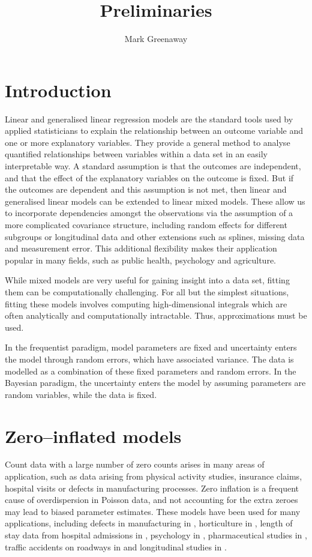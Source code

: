 \documentclass{amsart}[12pt]
\title{Preliminaries}
\author{Mark Greenaway}
\begin{document}
\setlength{\parindent}{0pt}
\maketitle

\section{Introduction}

Linear and generalised linear regression models are the standard tools used by applied statisticians to
explain the relationship between an outcome variable and one or more explanatory variables. They provide a
general method  to analyse quantified relationships between variables within a data set in an easily
interpretable way. A standard assumption is that the outcomes are independent, and that the effect of the
explanatory variables on the outcome is fixed. But if the outcomes are dependent and this assumption is not
met, then linear and generalised linear models can be extended to linear mixed models. These allow us to
incorporate dependencies amongst the  observations via the assumption of a more complicated covariance
structure, including random effects for  different subgroups or longitudinal data and other extensions such as
splines, missing data and measurement error. This additional flexibility makes their application popular in
many fields, such as public health, psychology and agriculture.

While mixed models are very useful for gaining insight into a data set, fitting them can be computationally
challenging. For all but the simplest situations, fitting these models involves computing high-dimensional
integrals which are often analytically and computationally intractable. Thus, approximations must be used.

In the frequentist paradigm, model parameters are fixed and uncertainty enters the model through random
errors, which have associated variance. The data is modelled as a combination of these fixed parameters and
random errors. In the Bayesian paradigm, the uncertainty enters the model by assuming parameters are random
variables, while the data is fixed.

\section{Zero--inflated models}
Count data with a large number of zero counts arises in many areas of application, such as data arising from
physical activity studies, insurance claims, hospital visits or defects in manufacturing processes. Zero
inflation is a frequent cause of overdispersion in Poisson data, and not accounting for the extra zeroes
may lead to biased parameter estimates. These models have been used for many applications, including defects
in manufacturing in \citep{lambert1992}, horticulture in \citep{BIOM:BIOM1030}, length of
stay data from hospital admissions in \citep{BIMJ:BIMJ200390024}, psychology in \citep{JOFP:rethink},
pharmaceutical studies in \citep{Min01042005}, traffic accidents on roadways in \citep{Shankar1997829} and
longitudinal studies in \citep{LeeWangScottYauMcLachlan2006}.
\end{document}
